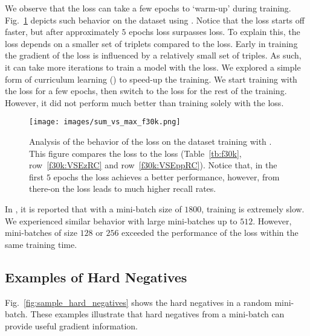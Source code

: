 We  observe that the \MAX{} loss can take a few epochs to `warm-up' 
during training.  Fig.~\ref{fig:sum_vs_max} depicts such behavior on the 
\fthk{} dataset using \RC{}.  Notice that the \SUM{} loss starts off 
faster, but after approximately $5$ epochs \MAX{} loss surpasses \SUM{} loss.  
To explain this, the \MAX{} loss depends on a smaller set of triplets 
compared to the \SUM{} loss.  Early in training the gradient of the \MAX{} 
loss is  influenced by a relatively small set of triples.  As such, it can 
take more iterations to train a model with the \MAX{} loss. We explored a simple 
form of curriculum learning (\cite{bengio2009curriculum}) to speed-up the  
training. We start training with the \SUM{} loss for a few epochs, then 
switch to the \MAX{} loss for the rest of the training. However, it did 
not perform much better than training solely with the \MAX{} loss.



\begin{figure}[h]
    \centering
\texttt{[image: images/sum\_vs\_max\_f30k.png]}
\caption{Analysis of the behavior of the \MAX{} loss on the \fthk{} 
        dataset training with \RC{}. This figure compares the \SUM{} loss to 
        the \MAX{} loss (Table~\ref{tb:f30k}, row~\ref{f30k:VSEzRC} and 
        row~\ref{f30k:VSEppRC}). Notice that, in the first $5$ epochs the 
        \SUM{} loss achieves a better performance, however, from there-on the 
        \MAX{} loss leads to much higher recall rates.}
        \label{fig:sum_vs_max}
\end{figure}


In \cite{schroff2015facenet}, it is reported that with a mini-batch size of 
$1800$,  training  is extremely slow. We experienced similar behavior 
with large mini-batches up to $512$. However, mini-batches of 
size $128$ or $256$ exceeded the performance of the \SUM{} loss within 
the same 
training time.




 \subsection{Examples of Hard Negatives}

Fig.~\ref{fig:sample_hard_negatives} shows the hard negatives in a random 
mini-batch. These examples illustrate that hard negatives from a mini-batch can 
provide useful gradient information.

